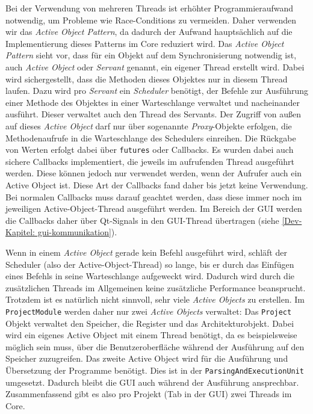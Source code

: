 Bei der Verwendung von mehreren Threads ist erhöhter Programmieraufwand
notwendig, um Probleme wie Race-Conditions zu vermeiden. Daher verwenden wir das
\textit{Active Object Pattern}, da dadurch der Aufwand hauptsächlich auf die
Implementierung dieses Patterns im Core reduziert wird. Das \textit{Active
Object Pattern} sieht vor, dass für ein Objekt auf dem Synchronisierung
notwendig ist, auch \textit{Active Object} oder \textit{Servant} genannt, ein
eigener Thread erstellt wird. Dabei wird sichergestellt, dass die Methoden
dieses Objektes nur in diesem Thread laufen. Dazu wird pro \textit{Servant} ein
\textit{Scheduler} benötigt, der Befehle zur Ausführung einer Methode des
Objektes in einer Warteschlange verwaltet und nacheinander ausführt. Dieser
verwaltet auch den Thread des Servants. Der Zugriff von außen auf dieses
\textit{Active Object} darf nur über sogenannte \textit{Proxy}-Objekte erfolgen,
die Methodenaufrufe in die Warteschlange des Schedulers einreihen. Die Rückgabe
von Werten erfolgt dabei über \texttt{futures} oder Callbacks. Es wurden dabei
auch sichere Callbacks implementiert, die jeweils im aufrufenden Thread
ausgeführt werden. Diese können jedoch nur verwendet werden, wenn der Aufrufer
auch ein Active Object ist. Diese Art der Callbacks fand daher bis jetzt keine
Verwendung. Bei normalen Callbacks muss darauf geachtet werden, dass diese immer
noch im jeweiligen Active-Object-Thread ausgeführt werden. Im Bereich der GUI
werden die Callbacks daher über Qt-Signals in den GUI-Thread übertragen (siehe
\ref{Dev-Kapitel: gui-kommunikation}).

Wenn in einem \textit{Active Object} gerade kein Befehl ausgeführt wird, schläft
der Scheduler (also der Active-Object-Thread) so lange, bis er durch das
Einfügen eines Befehls in seine Warteschlange aufgeweckt wird. Dadurch wird
durch die zusätzlichen Threads im Allgemeinen keine zusätzliche Performance
beansprucht. Trotzdem ist es natürlich nicht sinnvoll, sehr viele \textit{Active
Objects} zu erstellen. Im \texttt{ProjectModule} werden daher nur zwei
\textit{Active Objects} verwaltet: Das \texttt{Project} Objekt verwaltet den
Speicher, die Register und das Architekturobjekt. Dabei wird ein eigenes Active
Object mit einem Thread benötigt, da es beispielsweise möglich sein muss, über
die Benutzeroberfläche während der Ausführung auf den Speicher zuzugreifen. Das
zweite Active Object wird für die Ausführung und Übersetzung der Programme
benötigt. Dies ist in der \texttt{ParsingAndExecutionUnit} umgesetzt. Dadurch
bleibt die GUI auch während der Ausführung ansprechbar. Zusammenfassend gibt es
also pro Projekt (Tab in der GUI) zwei Threads im Core.


